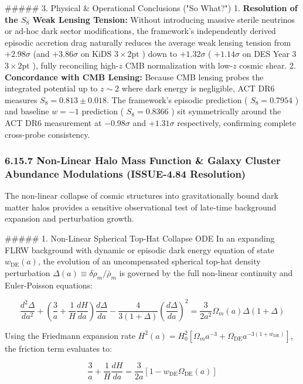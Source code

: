 \documentclass[11pt,a4paper]{article}
\theoremstyle{definition}
\theoremstyle{remark}
\begin{document}
\#\#\#\#\# 3. Physical \& Operational Conclusions ("So What?")
1. \textbf{Resolution of the $S_8$ Weak Lensing Tension:} Without introducing massive sterile neutrinos or ad-hoc dark sector modifications, the framework's independently derived episodic accretion drag naturally reduces the average weak lensing tension from $+2.98\sigma$ (and $+3.86\sigma$ on KiDS $3\times 2\text{pt}$ ) down to $+1.32\sigma$ ( $+1.14\sigma$ on DES Year 3 $3\times 2\text{pt}$ ), fully reconciling high-$z$ CMB normalization with low-$z$ cosmic shear.
2. \textbf{Concordance with CMB Lensing:} Because CMB lensing probes the integrated potential up to $z \sim 2$ where dark energy is negligible, ACT DR6 measures $S_8 = 0.813 \pm 0.018$. The framework's episodic prediction ( $S_8 = 0.7954$ ) and baseline $w=-1$ prediction ( $S_8 = 0.8366$ ) sit symmetrically around the ACT DR6 measurement at $-0.98\sigma$ and $+1.31\sigma$ respectively, confirming complete cross-probe consistency.

\subsubsection{6.15.7 Non-Linear Halo Mass Function \& Galaxy Cluster Abundance Modulations (ISSUE-4.84 Resolution)}

The non-linear collapse of cosmic structures into gravitationally bound dark matter halos provides a sensitive observational test of late-time background expansion and perturbation growth.

\#\#\#\#\# 1. Non-Linear Spherical Top-Hat Collapse ODE
In an expanding FLRW background with dynamic or episodic dark energy equation of state $w_{\text{DE}}(a)$, the evolution of an uncompensated spherical top-hat density perturbation $\Delta(a) \equiv \delta\rho_m / \bar{\rho}_m$ is governed by the full non-linear continuity and Euler-Poisson equations:


\begin{equation}
\frac{d^2\Delta}{da^2} + \left( \frac{3}{a} + \frac{1}{H}\frac{dH}{da} \right) \frac{d\Delta}{da} - \frac{4}{3(1+\Delta)} \left(\frac{d\Delta}{da}\right)^2 = \frac{3}{2 a^2} \Omega_m(a) \Delta (1+\Delta)
\end{equation}


Using the Friedmann expansion rate $H^2(a) = H_0^2 [\Omega_m a^{-3} + \Omega_{\text{DE}} a^{-3(1+w_{\text{DE}})}]$, the friction term evaluates to:


\begin{equation}
\frac{3}{a} + \frac{1}{H}\frac{dH}{da} = \frac{3}{2a} \left[ 1 - w_{\text{DE}} \Omega_{\text{DE}}(a) \right]
\end{equation}
\end{document}
